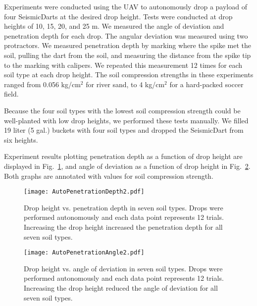  Experiments were conducted using the UAV to autonomously drop a payload of four SeismicDarts at the desired drop height. 
 Tests were conducted at drop heights of 10, 15, 20, and 25 m. 
 We measured the angle of deviation and penetration depth for each drop.
 The angular deviation was measured using two protractors.
 We measured penetration depth by marking where the spike met the soil, pulling the dart from the soil, and measuring the distance from the spike tip to the marking with calipers. 
  We repeated this measurement 12 times for each soil type at each drop height.  The soil compression strengths in these experiments ranged from 0.056 kg/cm$^2$ for river sand, to 4 kg/cm$^2$ for a hard-packed soccer field.

Because the four soil types with the lowest soil compression strength could be well-planted with low drop heights, we performed these tests manually. 
We filled 19 liter (5 gal.) buckets with four soil types and dropped the SeismicDart from six heights.

 
Experiment results plotting penetration depth as a function of drop height are displayed in Fig.~\ref{fig:DepthPlotIndoors}, and angle of deviation as a function of drop height in Fig.~\ref{fig:AnglePlotIndoors}.   Both graphs are annotated with values for soil compression strength. 

\begin{figure} \centering
{\texttt{[image: AutoPenetrationDepth2.pdf]}}
\caption{Drop height vs. penetration depth in seven soil types. Drops were performed autonomously and each data point represents 12 trials. Increasing the drop height increased the penetration depth for all seven soil types.} 
\label{fig:DepthPlotIndoors}
\end{figure}

\begin{figure} \centering
{\texttt{[image: AutoPenetrationAngle2.pdf]}}
\caption{Drop height vs. angle of deviation in seven soil types. Drops were performed autonomously and each data point represents 12 trials. Increasing the drop height reduced the angle of deviation for all seven soil types.} 
\label{fig:AnglePlotIndoors}
\vspace{-1em}
\end{figure}


